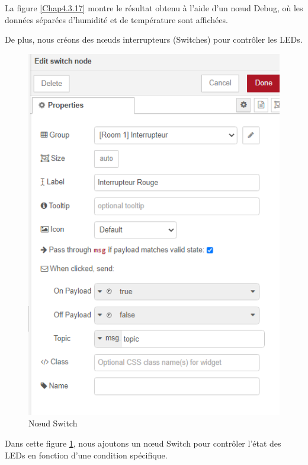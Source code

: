 La figure \ref{Chap4.3.17} montre le résultat obtenu à l'aide d'un nœud Debug, où les données séparées d'humidité et de température sont affichées.

De plus, nous créons des nœuds interrupteurs (Switches) pour contrôler les LEDs.


\begin{figure}[H]
\centering
\includegraphics[width=13cm]{Images/Node-6.png}
\caption{Nœud Switch}
\label{Chap4.3.18}
\end{figure}

Dans cette figure \ref{Chap4.3.18}, nous ajoutons un nœud Switch pour contrôler l'état des LEDs en fonction d'une condition spécifique.


